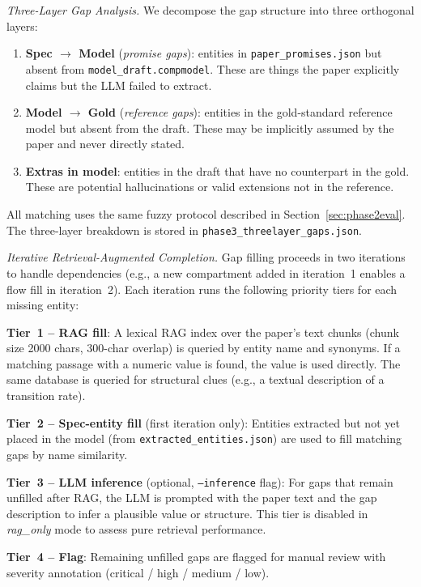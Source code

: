 \textit{Three-Layer Gap Analysis.} We decompose the gap structure into three orthogonal layers:

\begin{enumerate}[leftmargin=*, label=\arabic*.]
  \item \textbf{Spec $\to$ Model} (\emph{promise gaps}): entities in
        \texttt{paper\_promises.json} but absent from \texttt{model\_draft.compmodel}.
        These are things the paper explicitly claims but the LLM failed to extract.
  \item \textbf{Model $\to$ Gold} (\emph{reference gaps}): entities in the gold-standard
        reference model but absent from the draft. These may be implicitly assumed by
        the paper and never directly stated.
  \item \textbf{Extras in model}: entities in the draft that have no counterpart in the
        gold. These are potential hallucinations or valid extensions not in the reference.
\end{enumerate}

All matching uses the same fuzzy protocol described in Section~\ref{sec:phase2eval}.
The three-layer breakdown is stored in \texttt{phase3\_threelayer\_gaps.json}.

\textit{Iterative Retrieval-Augmented Completion.}
Gap filling proceeds in two iterations to handle dependencies (e.g., a new compartment
added in iteration~1 enables a flow fill in iteration~2). Each iteration runs the
following priority tiers for each missing entity:

\noindent\textbf{Tier~1 -- RAG fill}: A lexical RAG index over the paper's text chunks
(chunk size 2000 chars, 300-char overlap) is queried by entity name and synonyms.
If a matching passage with a numeric value is found, the value is used directly. The
same database is queried for structural clues (e.g., a textual description of a
transition rate).

\noindent\textbf{Tier~2 -- Spec-entity fill} (first iteration only): Entities extracted
but not yet placed in the model (from \texttt{extracted\_entities.json}) are used to
fill matching gaps by name similarity.

\noindent\textbf{Tier~3 -- LLM inference} (optional, \texttt{--inference} flag): For
gaps that remain unfilled after RAG, the LLM is prompted with the paper text and the
gap description to infer a plausible value or structure. This tier is disabled in
\emph{rag\_only} mode to assess pure retrieval performance.

\noindent\textbf{Tier~4 -- Flag}: Remaining unfilled gaps are flagged for manual review
with severity annotation (critical / high / medium / low).

